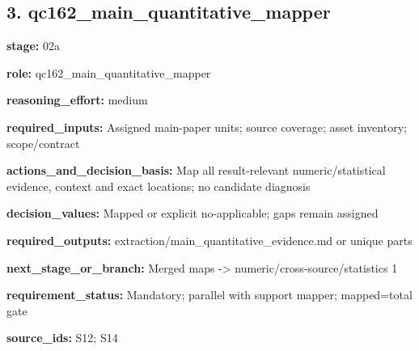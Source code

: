\documentclass[10pt,a4paper]{article}
\begin{document}
\subsection*{3.\allowbreak{} qc162\_\allowbreak{}main\_\allowbreak{}quantitative\_\allowbreak{}mapper}
\textbf{stage:} 02a\par
\textbf{role:} qc162\_\allowbreak{}main\_\allowbreak{}quantitative\_\allowbreak{}mapper\par
\textbf{reasoning\_\allowbreak{}effort:} medium\par
\textbf{required\_\allowbreak{}inputs:} Assigned main-\allowbreak{}paper units; source coverage; asset inventory; scope/\allowbreak{}contract\par
\textbf{actions\_\allowbreak{}and\_\allowbreak{}decision\_\allowbreak{}basis:} Map all result-\allowbreak{}relevant numeric/\allowbreak{}statistical evidence, context and exact locations; no candidate diagnosis\par
\textbf{decision\_\allowbreak{}values:} Mapped or explicit no-\allowbreak{}applicable; gaps remain assigned\par
\textbf{required\_\allowbreak{}outputs:} extraction/\allowbreak{}main\_\allowbreak{}quantitative\_\allowbreak{}evidence.\allowbreak{}md or unique parts\par
\textbf{next\_\allowbreak{}stage\_\allowbreak{}or\_\allowbreak{}branch:} Merged maps -\allowbreak{}> numeric/\allowbreak{}cross-\allowbreak{}source/\allowbreak{}statistics 1\par
\textbf{requirement\_\allowbreak{}status:} Mandatory; parallel with support mapper; mapped=total gate\par
\textbf{source\_\allowbreak{}ids:} S12; S14\par
\end{document}
